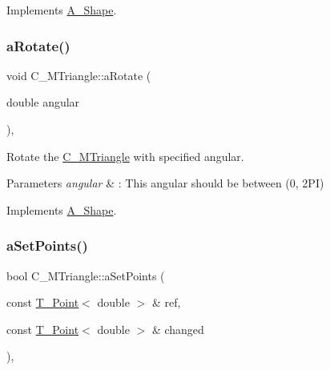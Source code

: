 Implements \hyperlink{classA__Shape_a25b4e0c34cdb46da5382fe9c7467efaf}{A\+\_\+\+Shape}.

\mbox{\label{classC__MTriangle_a33aa36879be70b0a11863801da56e92e}} 
\subsubsection{\texorpdfstring{a\+Rotate()}{aRotate()}\hspace{0.1cm}{\footnotesize\ttfamily [2/2]}}
{\footnotesize\ttfamily void C\+\_\+\+M\+Triangle\+::a\+Rotate (\begin{DoxyParamCaption}\item[{double}]{angular }\end{DoxyParamCaption})\hspace{0.3cm}{\ttfamily [override]}, {\ttfamily [virtual]}}



Rotate the \hyperlink{classC__MTriangle}{C\+\_\+\+M\+Triangle} with specified angular. 


\begin{DoxyParams}{Parameters}
{\em angular} & \+: This angular should be between (0, 2\+PI) \\
\hline
\end{DoxyParams}


Implements \hyperlink{classA__Shape_a25b4e0c34cdb46da5382fe9c7467efaf}{A\+\_\+\+Shape}.

\mbox{\label{classC__MTriangle_a5a3971eb0aafc16e5a34bd94130d7c6b}} 
\subsubsection{\texorpdfstring{a\+Set\+Points()}{aSetPoints()}\hspace{0.1cm}{\footnotesize\ttfamily [1/2]}}
{\footnotesize\ttfamily bool C\+\_\+\+M\+Triangle\+::a\+Set\+Points (\begin{DoxyParamCaption}\item[{const \hyperlink{classT__Point}{T\+\_\+\+Point}$<$ double $>$ \&}]{ref,  }\item[{const \hyperlink{classT__Point}{T\+\_\+\+Point}$<$ double $>$ \&}]{changed }\end{DoxyParamCaption})\hspace{0.3cm}{\ttfamily [override]}, {\ttfamily [virtual]}}



